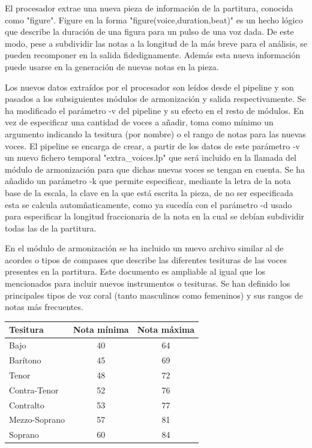 El procesador extrae una nueva pieza de información de la partitura, conocida como "figure". Figure en la forma "figure(voice,duration,beat)" es un hecho lógico que describe la duración de una figura para un pulso de una voz dada. De este modo, pese a subdividir las notas a la longitud de la más breve para el análisis, se pueden recomponer en la salida fidedignamente. Además esta nueva información puede usarse en la generación de nuevas notas en la pieza.

Los nuevos datos extraídos por el procesador son leídos desde el pipeline y son pasados a los subsiguientes módulos de armonización y salida respectivamente. Se ha modificado el parámetro -v del pipeline y su efecto en el resto de módulos. En vez de especificar una cantidad de voces a añadir, toma como mínimo un argumento indicando la tesitura (por nombre) o el rango de notas para las nuevas voces. El pipeline se encarga de crear, a partir de los datos de este parámetro -v un nuevo fichero temporal "extra\_voices.lp" que será incluido en la llamada del módulo de armonización para que dichas nuevas voces se tengan en cuenta. Se ha añadido un parámetro -k que permite especificar, mediante la letra de la nota base de la escala, la clave en la que está escrita la pieza, de no ser especificada esta se calcula automñaticamente, como ya sucedía con el parámetro -d usado para especificar la longitud fraccionaria de la nota en la cual se debían subdividir todas las de la partitura.

En el módulo de armonización se ha incluido un nuevo archivo similar al de acordes o tipos de compases que describe las diferentes tesituras de las voces presentes en la partitura. Este documento es ampliable al igual que los mencionados para incluir nuevos instrumentos o tesituras. Se han definido los principales tipos de voz coral (tanto masculinos como femeninos) y sus rangos de notas más frecuentes. 

\begin{center}
	\begin{tabular}{ | l | c | c | }
		\hline
		Tesitura & Nota mínima & Nota máxima \\ \hline \hline
		Bajo & 40 & 64 \\ \hline
		Barítono & 45 & 69 \\ \hline
		Tenor & 48 & 72 \\ \hline
		Contra-Tenor & 52 & 76 \\ \hline
		\hline
		Contralto & 53 & 77 \\ \hline
		Mezzo-Soprano & 57 & 81 \\ \hline
		Soprano & 60 & 84 \\ \hline
	\end{tabular}
\end{center}

